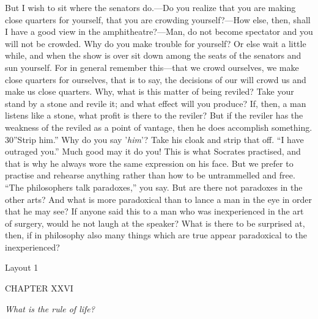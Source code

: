 But I wish to sit where the senators do.—Do you realize that you are making close quarters for yourself, that you are crowding yourself?—How else, then, shall I have a good view in the amphitheatre?—Man, do not become spectator and you will not be crowded. Why do you make trouble for yourself? Or else wait a little while, and when the show is over sit down among the seats of the senators and sun yourself. For in general remember this—that we crowd ourselves, we make close quarters for ourselves, that is to say, the decisions of our will crowd us and make us close quarters. Why, what is this matter of being reviled? Take your stand by a stone and revile it; and what effect will you produce? If, then, a man listens like a stone, what profit is there to the reviler? But if the reviler has the weakness of the reviled as a point of vantage, then he does accomplish something. 30''Strip him.'' Why do you say '\emph{him}'? Take his cloak and strip that off. ``I have outraged you.'' Much good may it do you! This is what Socrates practised, and that is why he always wore the same expression on his face. But we prefer to practise and rehearse anything rather than how to be untrammelled and free. ``The philosophers talk paradoxes,'' you say. But are there not paradoxes in the other arts? And what is more paradoxical than to lance a man in the eye in order that he may see? If anyone said this to a man who was inexperienced in the art of surgery, would he not laugh at the speaker? What is there to be surprised at, then, if in philosophy also many things which are true appear paradoxical to the inexperienced?



Layout 1

CHAPTER XXVI

\emph{What is the rule of life?}

